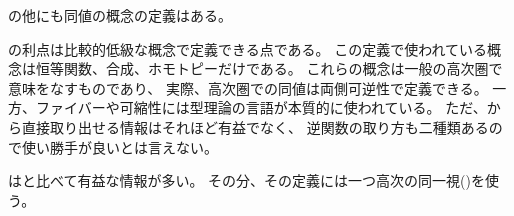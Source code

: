 \documentclass[index]{subfiles}
\begin{document}

の他にも同値の概念の定義はある。




の利点は比較的低級な概念で定義できる点である。
この定義で使われている概念は恒等関数、合成、ホモトピーだけである。
これらの概念は一般の高次圏で意味をなすものであり、
実際、高次圏での同値は両側可逆性で定義できる。
一方、ファイバーや可縮性には型理論の言語が本質的に使われている。
ただ、から直接取り出せる情報はそれほど有益でなく、
逆関数の取り方も二種類あるので使い勝手が良いとは言えない。




はと比べて有益な情報が多い。
その分、その定義には一つ高次の同一視(\myInlineMath{\myIsHAECoh})を使う。
\end{document}
